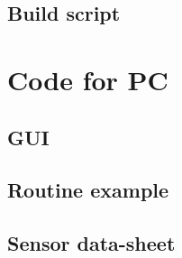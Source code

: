 \documentclass[12pt,a4paper]{article}
\begin{document}
\subsection{Build script}


\section{Code for PC}
\subsection{GUI}

\subsection{Routine example}

\subsection{Sensor data-sheet}

%
\end{document}
